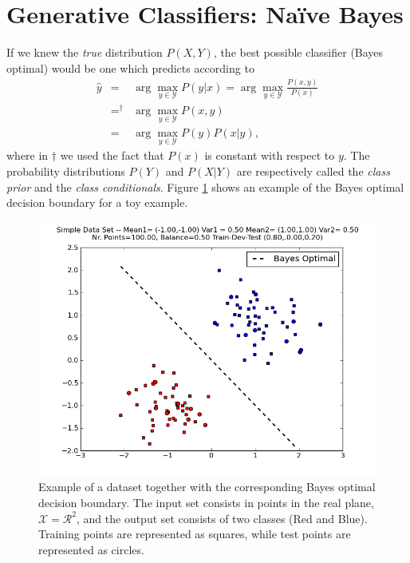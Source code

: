 \section{\label{s::naiveBayes}Generative Classifiers: Na\"{i}ve Bayes}

If we knew the \emph{true} distribution $P(X,Y)$, the best possible classifier (Bayes optimal) 
would be one which predicts according to
\begin{eqnarray}
{\hat y} &=& \arg\max_{y \in \mathcal{Y}} P(y|x) = \arg\max_{y \in \mathcal{Y}} \frac{P(x,y)}{P(x)} \nonumber\\
&=^{\dagger}& \arg\max_{y \in \mathcal{Y}} P(x,y) \nonumber \\
&=& \arg\max_{y \in \mathcal{Y}} P(y) P(x|y),
\end{eqnarray}
where in ${\dagger}$ we used the fact that $P(x)$ is constant with respect to $y$. 
The probability distributions $P(Y)$ and $P(X|Y)$ are respectively
called the \emph{class prior} and the \emph{class
  conditionals}. Figure \ref{simpleDataSet_bo} shows an example of
the Bayes optimal decision boundary for a toy example.  
\begin{figure}
\begin{center}
    \includegraphics[width=1\columnwidth]{figs/classification/gaussian_separabale_bo.png}
  \caption{\label{simpleDataSet_bo} Example of a dataset together with
    the corresponding Bayes optimal decision boundary.
    The input set consists in points in the real plane, $\mathcal{X} =
    \mathcal{R^2}$, and the output set consists of two classes (Red
    and Blue). Training points are represented as squares, while test
    points are represented as circles.}
  \end{center}
\end{figure}
